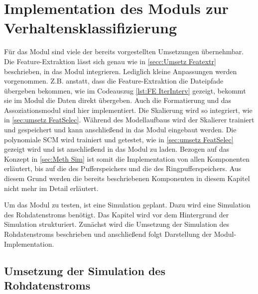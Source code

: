 \section{Implementation des Moduls zur Verhaltensklassifizierung} \label{sec:umse ModulKonzept}
Für das Modul sind viele der bereits vorgestellten Umsetzungen übernehmbar. Die Feature-Extraktion lässt sich genau wie in \autoref{secc:Umsetz Featextr} beschrieben, in das Modul integrieren. Lediglich kleine Anpassungen werden vorgenommen. Z.B. anstatt, dass die Feature-Extraktion die Dateipfade übergeben bekommen, wie im Codeauszug \ref{lst:FE IterInterv} gezeigt, bekommt sie im Modul die Daten direkt übergeben. Auch die Formatierung und das Assoziationsmodul sind hier implementiert. Die Skalierung wird so integriert, wie in \autoref{sec:umsetz FeatSelec}. Während des Modellaufbaus wird der Skalierer trainiert und gespeichert und kann anschließend in das Modul eingebaut werden. Die polynomiale SCM wird trainiert und getestet, wie in \autoref{sec:umsetz FeatSelec} gezeigt wird und ist anschließend in das Modul zu laden. Bezogen auf das Konzept in \autoref{sec:Meth Sim} ist somit die Implementation von allen Komponenten erläutert, bis auf die des Pufferspeichers und die des Ringpufferspeichers. Aus diesem Grund werden die bereits beschriebenen Komponenten in diesem Kapitel nicht mehr im Detail erläutert.\par

Um das Modul zu testen, ist eine Simulation geplant. Dazu wird eine Simulation des Rohdatenstroms benötigt. Das Kapitel wird vor dem Hintergrund der Simulation strukturiert. Zunächst wird die Umsetzung der Simulation des Rohdatenstroms beschrieben und anschließend folgt Darstellung der Modul-Implementation.

\subsection{Umsetzung der Simulation des Rohdatenstroms}


